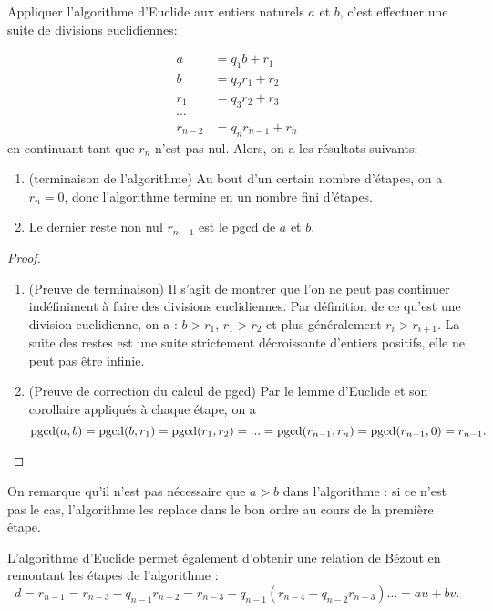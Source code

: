 \begin{theoreme}

Appliquer l'algorithme d'Euclide aux entiers naturels $a$ et $b$, c'est effectuer une suite de divisions euclidiennes:

\begin{align*}
a &= q_1 b + r_1\\
b &= q_2 r_1+r_2\\
r_1 &= q_3 r_2+ r_3\\
\cdots & \\
r_{n-2} &= q_nr_{n-1}+r_n
\end{align*}
en continuant tant que $r_n$ n'est pas nul. Alors, on a les résultats suivants:

\begin{enumerate}
\item (terminaison de l'algorithme) Au bout d'un certain nombre d'étapes, on a $r_n=0$, donc l'algorithme termine en un nombre fini d'étapes.
\item Le dernier reste non nul $r_{n-1}$ est le pgcd de $a$ et $b$.
\end{enumerate}
\end{theoreme}
\begin{proof}

\begin{enumerate}
\item (Preuve de terminaison) Il s'agit de montrer que l'on ne peut pas continuer indéfiniment à faire des divisions euclidiennes. Par définition de ce qu'est une division euclidienne, on a  : $b>r_1$, $r_1>r_2$ et plus généralement $r_i>r_{i+1}$. La suite des restes est une suite strictement décroissante d'entiers positifs, elle ne peut pas être infinie.
\item (Preuve de correction du calcul de pgcd) Par le lemme d'Euclide et son corollaire appliqués à chaque étape, on a 
\[
\operatorname{pgcd}(a,b) = \operatorname{pgcd}(b,r_1)=\operatorname{pgcd}(r_1,r_2) = ... = \operatorname{pgcd}(r_{n-1},r_n) = \operatorname{pgcd}(r_{n-1},0) = r_{n-1}.
\]

\end{enumerate}
\end{proof}

On remarque qu'il n'est pas nécessaire que $a>b$ dans l'algorithme : si ce n'est pas le cas, l'algorithme les replace dans le bon ordre au cours de la première étape.

L'algorithme d'Euclide permet également d'obtenir une relation de Bézout en \og remontant \fg{} les étapes de l'algorithme : 
\[ d = r_{n-1} = r_{n-3} - q_{n-1}r_{n-2} = r_{n-3} - q_{n-1}(r_{n-4} - q_{n-2}r_{n-3})... = au+bv.\]

